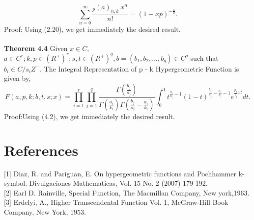 \documentclass[11pt,a4paper]{article}
\numberwithin{equation}{section}
\begin{document}
\begin{equation}
\sum_{n=0}^{\infty}\frac{_{p}(a)_{n,k}\: x^{n}}{n!}= (1-xp)^{-\frac{a}{k}}. 
\end{equation}
Proof: Using (2.20), we get immediately the desired result.\\\\
\textbf{Theorem 4.4} Given $ x \in C, $ $ a\in C^{r}; k,p \in (R^{+})^{r}; s,t \in (R^{+})^{q}, b=(b_{1},b_{2},...,b_{q})\in C^{q} $ such that $b_{i} \in C/ s_{i}Z^{-}.$ The Integral Representation of 
p - k Hypergeometric Function is given by,
\begin{equation}
F(a,p,k;b,t,s;x)=\prod_{i=1}^{r}\prod_{j=1}^{q}\frac{\Gamma(\frac{b_{j}}{s_{j}})}{\Gamma(\frac{a_{i}}{k_{i}})\Gamma(\frac{b_{j}}{s_{j}}-\frac{a_{i}}{k_{i}})}\int_{0}^{1}t^{\frac{a_{i}}{k_{i}}-1}(1-t)^{\frac{b_{j}}{s_{j}}-\frac{a_{i}}{k_{i}}-1}e^{\frac{p_{i}}{t_{j}}xt}dt.
 \end{equation} 
 Proof:Using (4.2), we get immediately the desired result.\\
\section*{References}
\label{1}[1]	Diaz, R. and Pariguan, E. On hypergeometric functions and Pochhammer k-symbol. Divulgaciones Mathematicas, Vol. 15 No. 2 (2007) 179-192.\\
\label{2}[2]  Earl D. Rainville, Special Function, The Macmillan Company, New york,1963.\\
\label{3}[3]  Erdelyi, A., Higher Transcendental  Function Vol. 1, McGraw-Hill Book Company, New York, 1953. 
\end{document}
